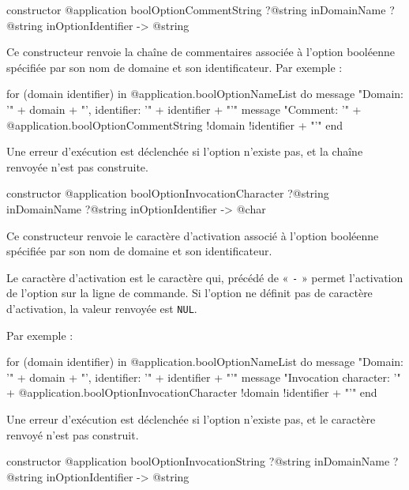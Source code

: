 
\begin{galgas3box}
constructor @application boolOptionCommentString
    ?@string inDomainName
    ?@string inOptionIdentifier -> @string
\end{galgas3box}

Ce constructeur renvoie la chaîne de commentaires associée à l'option booléenne spécifiée par son nom de domaine et son identificateur. Par exemple :
\begin{galgas3}
for (domain identifier) in @application.boolOptionNameList do
  message "Domain: '" + domain + "', identifier: '" + identifier + "'\n"
  message "Comment: '"
    + @application.boolOptionCommentString {!domain !identifier} + "'\n"
end
\end{galgas3}

Une erreur d'exécution est déclenchée si l'option n'existe pas, et la chaîne renvoyée n'est pas construite.



\begin{galgas3box}
constructor @application boolOptionInvocationCharacter
    ?@string inDomainName
    ?@string inOptionIdentifier -> @char
\end{galgas3box}

Ce constructeur renvoie le caractère d'activation associé à l'option booléenne spécifiée par son nom de domaine et son identificateur.

Le caractère d'activation est le caractère qui, précédé de « \texttt{-} » permet l'activation de l'option sur la ligne de commande. Si l'option ne définit pas de caractère d'activation, la valeur renvoyée est \texttt{NUL}.

 Par exemple :
\begin{galgas3}
for (domain identifier) in @application.boolOptionNameList do
  message "Domain: '" + domain + "', identifier: '" + identifier + "'\n"
  message "Invocation character: '"
    + @application.boolOptionInvocationCharacter {!domain !identifier} + "'\n"
end
\end{galgas3}

Une erreur d'exécution est déclenchée si l'option n'existe pas, et le caractère renvoyé n'est pas construit.



\begin{galgas3box}
constructor @application boolOptionInvocationString
    ?@string inDomainName
    ?@string inOptionIdentifier -> @string
\end{galgas3box}

